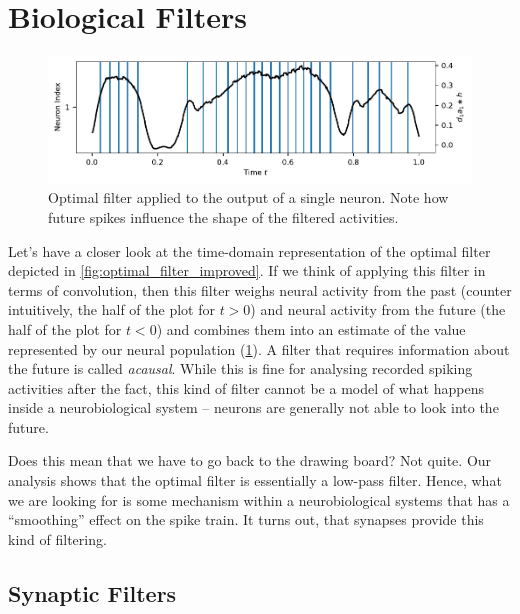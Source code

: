 \documentclass[10pt,letterpaper,oneside]{article}
\begin{document}
\newpage

\section{Biological Filters}

\begin{figure}
	\includegraphics{media/filter_magnification.pdf}
	\caption{Optimal filter applied to the output of a single neuron. Note how future spikes influence the shape of the filtered activities.}
	\label{fig:filter_magnification}
\end{figure}

Let's have a closer look at the time-domain representation of the optimal filter depicted in \cref{fig:optimal_filter_improved}. If we think of applying this filter in terms of convolution, then this filter weighs neural activity from the past (counter intuitively, the half of the plot for $t > 0$) and neural activity from the future (the half of the plot for $t < 0$) and combines them into an estimate of the value represented by our neural population (\cref{fig:filter_magnification}). A filter that requires information about the future is called \emph{acausal}. While this is fine for analysing recorded spiking activities after the fact, this kind of filter cannot be a model of what happens inside a neurobiological system -- neurons are generally not able to look into the future.

Does this mean that we have to go back to the drawing board? Not quite. Our analysis shows that the optimal filter is essentially a low-pass filter. Hence, what we are looking for is some mechanism within a neurobiological systems that has a \enquote{smoothing} effect on the spike train. It turns out, that synapses provide this kind of filtering.

\subsection{Synaptic Filters}
\end{document}
